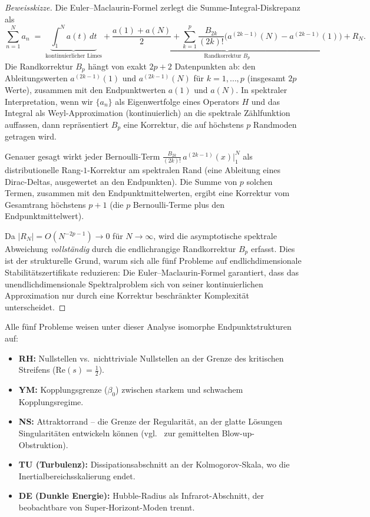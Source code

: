 \documentclass[12pt,a4paper]{article}
\theoremstyle{definition}
\theoremstyle{remark}
\begin{document}
\begin{proof}[Beweisskizze]
Die Euler--Maclaurin-Formel zerlegt die Summe-Integral-Diskrepanz als
\[
\sum_{n=1}^{N} a_n \;=\; \underbrace{\int_1^N a(t)\,dt}_{\text{kontinuierlicher Limes}} + \underbrace{\frac{a(1)+a(N)}{2} + \sum_{k=1}^{p} \frac{B_{2k}}{(2k)!}\bigl(a^{(2k-1)}(N) - a^{(2k-1)}(1)\bigr)}_{\text{Randkorrektur } B_p} + R_N.
\]
Die Randkorrektur $B_p$ hängt von exakt $2p+2$ Datenpunkten ab: den Ableitungswerten $a^{(2k-1)}(1)$ und $a^{(2k-1)}(N)$ für $k = 1, \ldots, p$ (insgesamt $2p$ Werte), zusammen mit den Endpunktwerten $a(1)$ und $a(N)$. In spektraler Interpretation, wenn wir $\{a_n\}$ als Eigenwertfolge eines Operators $H$ und das Integral als Weyl-Approximation (kontinuierlich) an die spektrale Zählfunktion auffassen, dann repräsentiert $B_p$ eine Korrektur, die auf höchstens $p$ Randmoden getragen wird.

Genauer gesagt wirkt jeder Bernoulli-Term $\frac{B_{2k}}{(2k)!}\,a^{(2k-1)}(x)\big|_1^N$ als distributionelle Rang-$1$-Korrektur am spektralen Rand (eine Ableitung eines Dirac-Deltas, ausgewertet an den Endpunkten). Die Summe von $p$ solchen Termen, zusammen mit den Endpunktmittelwerten, ergibt eine Korrektur vom Gesamtrang höchstens $p+1$ (die $p$ Bernoulli-Terme plus den Endpunktmittelwert).

Da $|R_N| = O(N^{-2p-1}) \to 0$ für $N \to \infty$, wird die asymptotische spektrale Abweichung \emph{vollständig} durch die endlichrangige Randkorrektur $B_p$ erfasst. Dies ist der strukturelle Grund, warum sich alle fünf Probleme auf endlichdimensionale Stabilitätszertifikate reduzieren: Die Euler--Maclaurin-Formel garantiert, dass das unendlichdimensionale Spektralproblem sich von seiner kontinuierlichen Approximation nur durch eine Korrektur beschränkter Komplexität unterscheidet.
\end{proof}

Alle fünf Probleme weisen unter dieser Analyse isomorphe Endpunktstrukturen auf:
\begin{itemize}
    \item \textbf{RH:} Nullstellen vs.\ nichttriviale Nullstellen an der Grenze des kritischen Streifens ($\mathrm{Re}(s)=\tfrac{1}{2}$).
    \item \textbf{YM:} Kopplungsgrenze ($\beta_0$) zwischen starkem und schwachem Kopplungsregime.
    \item \textbf{NS:} Attraktorrand -- die Grenze der Regularität, an der glatte Lösungen Singularitäten entwickeln können (vgl.~\cite{Tao2016} zur gemittelten Blow-up-Obstruktion).
    \item \textbf{TU (Turbulenz):} Dissipationsabschnitt an der Kolmogorov-Skala, wo die Inertialbereichsskalierung endet.
    \item \textbf{DE (Dunkle Energie):} Hubble-Radius als Infrarot-Abschnitt, der beobachtbare von Super-Horizont-Moden trennt.
\end{itemize}
\end{document}
